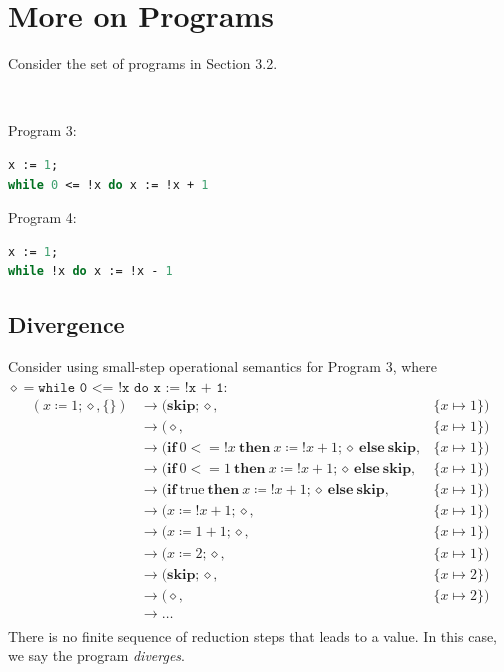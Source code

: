 \section{More on Programs}
Consider the set of programs in Section 3.2. 

\begin{eg}~

Program 3:
\begin{lstlisting}[language=OCaml]
x := 1;
while 0 <= !x do x := !x + 1
\end{lstlisting}

Program 4:
\begin{lstlisting}[language=OCaml]
x := 1;
while !x do x := !x - 1
\end{lstlisting}
\end{eg}

\subsection{Divergence}
Consider using small-step operational semantics for Program 3, where \(\diamond = \texttt{while 0 <= !x do x := !x + 1}\):
\[
\begin{aligned}
(x \coloneqq 1; \diamond, \{\}) &\to (\mathbf{skip}; \diamond, &\{x \mapsto 1\}) \\
&\to (\diamond, &\{x \mapsto 1\}) \\
&\to (\mathbf{if}\ 0 <= !x\ \mathbf{then}\ x \coloneqq !x + 1; \diamond\ \mathbf{else}\ \mathbf{skip}, &\{x \mapsto 1\}) \\
&\to (\mathbf{if}\ 0 <= 1\ \mathbf{then}\ x \coloneqq !x + 1; \diamond\ \mathbf{else}\ \mathbf{skip}, &\{x \mapsto 1\}) \\
&\to (\mathbf{if}\ \text{true}\ \mathbf{then}\ x \coloneqq !x + 1; \diamond\ \mathbf{else}\ \mathbf{skip}, &\{x \mapsto 1\}) \\
&\to (x \coloneqq !x + 1; \diamond, &\{x \mapsto 1\}) \\
&\to (x \coloneqq 1 + 1; \diamond, &\{x \mapsto 1\}) \\
&\to (x \coloneqq 2; \diamond, &\{x \mapsto 1\}) \\
&\to (\mathbf{skip}; \diamond, &\{x \mapsto 2\}) \\
&\to (\diamond, &\{x \mapsto 2\}) \\
&\to \dots \\
\end{aligned}
\]
There is no finite sequence of reduction steps that leads to a value. In this case, we say the program \textit{diverges}.

